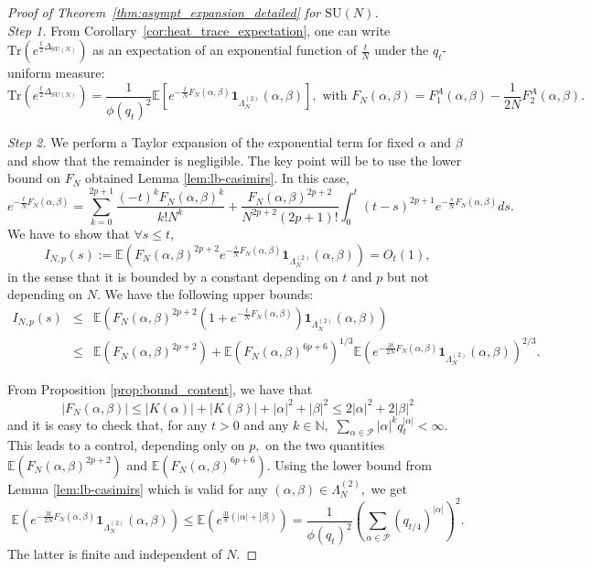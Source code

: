 \documentclass[10pt,a4paper]{amsart}
\newcommand\E{\mathbb{E}}
\newcommand\Pfr{\mathscr{P}}
\newcommand\SU{{\mathrm{SU}}}
\newcommand\Tr{\mathrm{Tr}}
\begin{document}
\begin{proof}[Proof of Theorem~\ref{thm:asympt_expansion_detailed} for $\SU(N)$]\mbox{}\\


\emph{Step 1.} From Corollary~\ref{cor:heat_trace_expectation}, one can write  $\Tr(e^{\frac{t}{2}\Delta_{\SU(N)}})$ as an expectation of an exponential function of $\frac t N$ under the $q_t$-uniform measure:
\[
\Tr(e^{\frac{t}{2}\Delta_{\SU(N)}})=\frac{1}{\phi(q_t)^2}\E[e^{- \frac t N F_{N}(\alpha,\beta)}\mathbf{1}_{\Lambda_N^{(2)}}(\alpha,\beta)], \text{ with } F_{N}(\alpha,\beta)=F_1^A(\alpha,\beta)-\frac{1}{2N}F_2^A(\alpha,\beta).
\]

\emph{Step 2.} We perform a Taylor expansion of the exponential term for fixed $\alpha$ and $\beta$  and show that the remainder is negligible.
The key point will be to use the lower bound on $F_N$ obtained  Lemma \ref{lem:lb-casimirs}. In this case,
\[
e^{- \frac t N F_{N}(\alpha,\beta)}=\sum_{k=0}^{2p+1} \frac{(-t)^k F_{N}(\alpha,\beta)^k}{k!N^k}+ \frac{F_N(\alpha, \beta)^{2p+2}}{N^{2p+2}(2p+1)!} \int_0^t (t-s)^{2p+1} e^{-\frac{s}{N} F_{N}(\alpha,\beta)}ds.
\]
We have to show that $\forall s \leq t,$
\[
I_{N,p}(s):=\mathbb E\left(F_{N}(\alpha,\beta)^{2p+2} e^{-\frac{s}{N} F_{N}(\alpha,\beta)}\mathbf{1}_{\Lambda_N^{(2)}}(\alpha,\beta)\right) =O_t(1),
\]
in the sense that it is bounded by a constant depending on $t$ and $p$ but not depending on $N.$ We have the following upper bounds:
\begin{eqnarray*}
 I_{N,p}(s) & \leq & \mathbb E\left(F_{N}(\alpha,\beta)^{2p+2}\left( 1 +  e^{-\frac{t}{N} F_{N}(\alpha,\beta)}\right)\mathbf{1}_{\Lambda_N^{(2)}}(\alpha,\beta)\right) \\
 & \leq& \mathbb E\left(F_{N}(\alpha,\beta)^{2p+2}\right) +  \mathbb E\left(F_{N}(\alpha,\beta)^{6p+6}\right)^{1/3} \mathbb E \left(  e^{-\frac{3t}{2N} F_{N}(\alpha,\beta)}  \mathbf{1}_{\Lambda_N^{(2)}}(\alpha,\beta) \right)^{2/3}.
\end{eqnarray*}


From Proposition \ref{prop:bound_content}, we have that
\[
 |F_{N}(\alpha,\beta)|  \leq |K(\alpha)| + |K(\beta)| + |\alpha|^2 + |\beta|^2   \leq 2 |\alpha|^2 + 2 |\beta|^2
\]
and it is easy to check that, for any $t >0$ and any $k\in\mathbb N,$ $\sum_{\alpha \in \Pfr} |\alpha|^{k} q_t^{|\alpha|} <\infty$. This leads to a control, depending only on $p,$ on the two quantities $\mathbb E\left(F_{N}(\alpha,\beta)^{2p+2}\right)$ and $\mathbb E\left(F_{N}(\alpha,\beta)^{6p+6}\right)$. Using the lower bound from Lemma \ref{lem:lb-casimirs} which is valid for any $(\alpha, \beta) \in \Lambda_N^{(2)},$ we get
\[   \mathbb E \left(  e^{-\frac{3t}{2N} F_{N}(\alpha,\beta)}  \mathbf{1}_{\Lambda_N^{(2)}}(\alpha,\beta) \right) \leq \mathbb E \left(  e^{\frac{3t}{8}(|\alpha|+|\beta|)}   \right) = \frac{1}{\phi(q_t)^2}\left(\sum_{\alpha \in \Pfr} (q_{t/4})^{|\alpha|}\right)^2.\]
The latter is finite and independent of $N.$


\end{proof}
\end{document}
